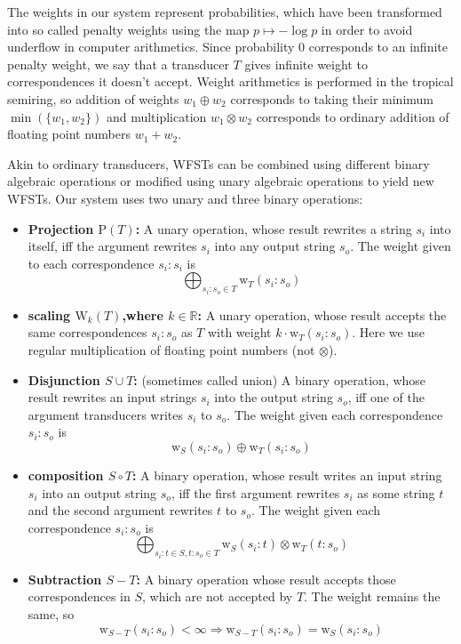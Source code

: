 \documentclass[a4paper,conference]{IEEEtran}
\begin{document}
The weights in our system represent probabilities, which have been
transformed into so called penalty weights using the map $p \mapsto
-\log p$ in order to avoid underflow in computer arithmetics. Since
probability $0$ corresponds to an infinite penalty weight, we say that
a transducer $T$ gives infinite weight to correspondences it doesn't
accept. Weight arithmetics is performed in the tropical semiring, so
addition of weights $w_1 \oplus w_2$ corresponds to taking their
minimum $\min(\{w_1,w_2\})$ and multiplication $w_1 \otimes w_2$
corresponds to ordinary addition of floating point numbers $w_1 + w_2$.

Akin to ordinary transducers, WFSTs can be combined using
different binary algebraic operations or modified using unary
algebraic operations to yield new WFSTs. Our system uses two unary and three binary operations:
\begin{itemize}
\item {\bf Projection $\mathrm{P}(T)$:} A unary operation, whose result
  rewrites a string $s_i$ into itself, iff the argument rewrites $s_i$
  into any output string $s_o$. The weight given to each correspondence
  $s_i:s_i$ is
  \begin{equation}
    \bigoplus_{s_i\mathrm{:}s_o \in T} \mathrm{w}_T(s_i\mathrm{:}s_o)
  \end{equation}
\item {\bf scaling $\mathrm{W}_k(T)$,where $k \in \mathbb{R}$:} A unary operation, whose result accepts the same correspondences $s_i\mathrm{:}s_o$ as $T$ with weight $k\cdot \mathrm{w}_T(s_i\mathrm{:}s_o)$. Here we use regular multiplication of floating point numbers (not $\otimes$).
\item {\bf Disjunction $S \cup T$:} (sometimes called union) A binary
  operation, whose result rewrites an input strings $s_i$ into the
  output string $s_o$, iff one of the argument transducers writes
  $s_i$ to $s_o$. The weight given each correspondence
  $s_i\mathrm{:}s_o$ is
  \begin{equation}
    \mathrm{w}_S(s_i\mathrm{:}s_o) \oplus \mathrm{w}_T(s_i\mathrm{:}s_o)
  \end{equation}
\item {\bf composition $S \circ T$:} A binary operation, whose result
  writes an input string $s_i$ into an output string $s_o$, iff the
  first argument rewrites $s_i$ as some string $t$ and the second
  argument rewrites $t$ to $s_o$. The weight given each correspondence
  $s_i\mathrm{:}s_o$ is
  \begin{equation}
    \bigoplus_{s_i\mathrm{:}t \in S, t\mathrm{:}s_o \in T} \mathrm{w}_S(s_i\mathrm{:}t) \otimes \mathrm{w}_T(t\mathrm{:}s_o)
    \end{equation}
\item {\bf Subtraction $S - T$:} A binary operation whose result accepts those correspondences in $S$, which are not accepted by $T$. The weight remains the same, so
  \begin{equation}
    \mathrm{w}_{S-T}(s_i\mathrm{:}s_o) < \infty \Rightarrow \mathrm{w}_{S-T}(s_i\mathrm{:}s_o) = \mathrm{w}_{S}(s_i\mathrm{:}s_o)
  \end{equation}
\end{itemize}
\end{document}
